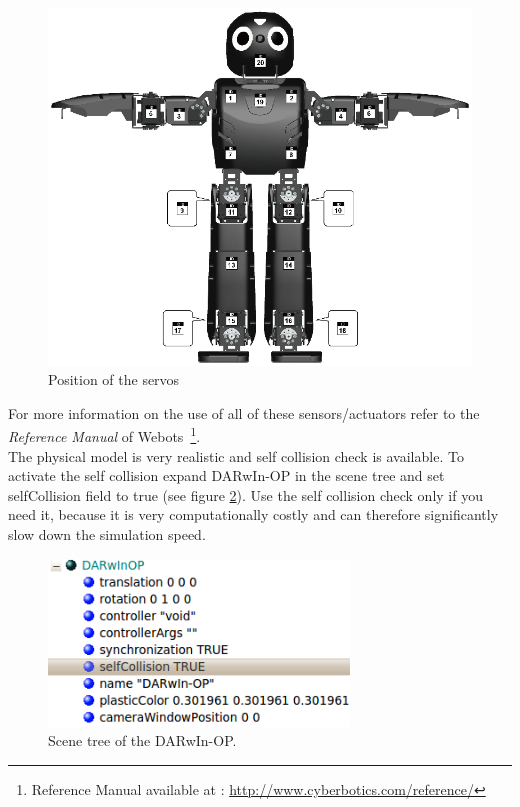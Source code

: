 \documentclass[a4paper, 12pt]{article}  		%
\begin{document}
\newpage
\vspace{5cm}
\begin{figure}[H]
\begin{center}
\includegraphics[width=16cm]{DARwIn-OP_Actuator.png}
\caption{Position of the servos}
\label{Actuator}
\end{center}
\end{figure}
For more information on the use of all of these sensors/actuators refer to the \textit{Reference Manual} of Webots \,\footnote{ Reference Manual available at : \url{http://www.cyberbotics.com/reference/}}.\\



\newpage
The physical model is very realistic and self collision check is available. To activate the self collision expand DARwIn-OP in the scene tree and set selfCollision field to true (see figure \ref{selfCollision}). Use the self collision check only if you need it, because it is very computationally costly and can therefore significantly slow down the simulation speed.\\

\begin{figure}[H]
\begin{center}
\includegraphics[width=8cm]{selfCollision.png}
\caption{Scene tree of the DARwIn-OP.}
\label{selfCollision}
\end{center}
\end{figure}
\end{document}
